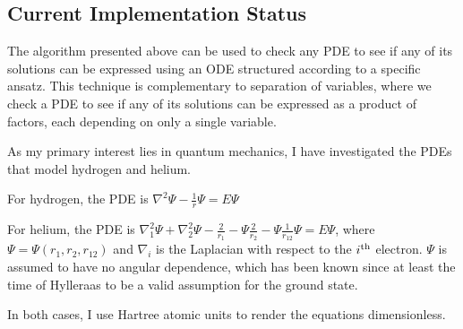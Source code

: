\documentclass{article}
\begin{document}
\subsection*{Current Implementation Status}

The algorithm presented above can be used to check any PDE to see if any of its solutions
can be expressed using an ODE structured according to a specific ansatz.  This technique
is complementary to separation of variables, where we check a PDE to see if any of
its solutions can be expressed as a product of factors, each depending on only
a single variable.

As my primary interest lies in quantum mechanics, I have investigated the PDEs
that model hydrogen and helium.

For hydrogen, the PDE is $\nabla^2 \Psi - \frac{1}{r} \Psi = E \Psi$

For helium, the PDE is $\nabla_1^2 \Psi + \nabla_2^2 \Psi - \frac{2}{r_1} - \Psi \frac{2}{r_2} - \Psi \frac{1}{r_{12}} \Psi = E \Psi$,
where $\Psi=\Psi(r_1,r_2,r_{12})$ and $\nabla_i$ is the Laplacian with respect to the $i^{\rm th}$ electron.
$\Psi$ is assumed to have no angular dependence, which has been known since
at least the time of Hylleraas to be a valid assumption for the ground state.

In both cases, I use Hartree atomic units to render the equations dimensionless.
\end{document}
